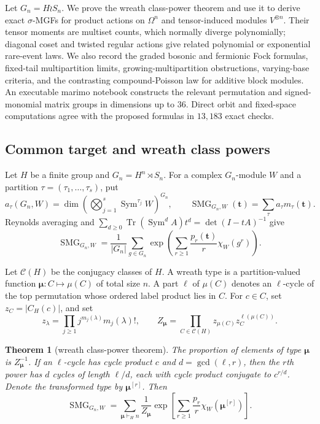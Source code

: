 \documentclass[10pt]{article}
\newcommand{\Sym}{\operatorname{Sym}}
\newcommand{\Tr}{\operatorname{Tr}}
\newcommand{\SMG}{\operatorname{SMG}}
\newcommand{\MGF}{\SMG}
\newtheorem{theorem}{Theorem}
\begin{document}
Let $G_n=H\wr S_n$.  We prove the wreath class-power theorem and use it to
derive exact $\sigma$-MGFs for product actions on $\Omega^n$ and
tensor-induced modules $V^{\otimes n}$.  Their tensor moments are multiset
counts, which normally diverge polynomially; diagonal coset and twisted
regular actions give related polynomial or exponential rare-event laws.  We
also record the graded bosonic and fermionic Fock formulas, fixed-tail
multipartition limits, growing-multipartition obstructions, varying-base
criteria, and the contrasting compound-Poisson law for additive block
modules.  An executable marimo notebook constructs the relevant permutation
and signed-monomial matrix groups in dimensions up to $36$.  Direct orbit and
fixed-space computations agree with the proposed formulas in $13{,}183$
exact checks.

\subsection{Common target and wreath class powers}

Let $H$ be a finite group and $G_n=H^n\rtimes S_n$.  For a complex
$G_n$-module $W$ and a partition $\tau=(\tau_1,\ldots,\tau_s)$, put
\[
 a_\tau(G_n,W)=\dim\left(\bigotimes_{j=1}^s\Sym^{\tau_j}W\right)^{G_n},
 \qquad
 \MGF_{G_n,W}(\mathbf t)=\sum_\tau a_\tau m_\tau(\mathbf t).
\]
Reynolds averaging and
$\sum_{d\ge0}\Tr(\Sym^d A)t^d=\det(I-tA)^{-1}$ give
\begin{equation}\label{nd:multiplicative_wreath:eq:universal-molien}
 \MGF_{G_n,W}
 =\frac1{|G_n|}\sum_{g\in G_n}
 \exp\!\left(\sum_{r\ge1}\frac{p_r(\mathbf t)}r\chi_W(g^r)\right).
\end{equation}

Let $\mathcal C(H)$ be the conjugacy classes of $H$.  A wreath type is a
partition-valued function $\boldsymbol\mu:C\mapsto\mu(C)$ of total size $n$.
A part $\ell$ of $\mu(C)$ denotes an $\ell$-cycle of the top permutation whose
ordered label product lies in $C$.  For $c\in C$, set $z_C=|C_H(c)|$, and set
\[
 z_\lambda=\prod_{j\ge1}j^{m_j(\lambda)}m_j(\lambda)!,\qquad
 Z_{\boldsymbol\mu}=\prod_{C\in\mathcal C(H)}
 z_{\mu(C)}z_C^{\ell(\mu(C))}.
\]

\begin{theorem}[wreath class-power theorem]\label{nd:multiplicative_wreath:thm:class-power}
The proportion of elements of type $\boldsymbol\mu$ is
$Z_{\boldsymbol\mu}^{-1}$.  If an $\ell$-cycle has cycle product $c$ and
$d=\gcd(\ell,r)$, then the $r$th power has $d$ cycles of length $\ell/d$,
each with cycle product conjugate to $c^{r/d}$.  Denote the transformed type
by $\boldsymbol\mu^{[r]}$.  Then
\begin{equation}\label{nd:multiplicative_wreath:eq:universal-class}
 \boxed{\MGF_{G_n,W}=
 \sum_{\boldsymbol\mu\vdash_H n}\frac1{Z_{\boldsymbol\mu}}
 \exp\!\left[\sum_{r\ge1}\frac{p_r}{r}
 \chi_W(\boldsymbol\mu^{[r]})\right].}
\end{equation}
\end{theorem}
\end{document}
